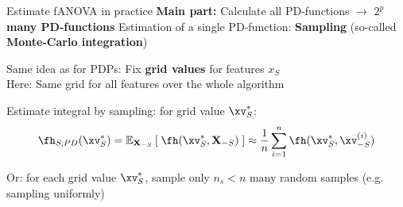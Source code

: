 \documentclass[10pt,compress,t,notes=noshow, xcolor=table]{beamer}
\newcommand{\Xv}{\mathbf{X}} %
\begin{document}
\begin{framev}[align=top]{Estimate fANOVA in practice
}
\textbf{Main part:} Calculate all PD-functions $\rightarrow$ \textbf{$2^p$ many PD-functions}
Estimation of a single PD-function: \textbf{Sampling}
(so-called \textbf{Monte-Carlo integration})
\begin{itemizeM}
\item Same idea as for PDPs: Fix \textbf{grid values} for features $x_S$ \\
Here: Same grid for all features over the whole algorithm
\item Estimate integral by sampling: for grid value $\xv_S^*$:
$$
\fh_{S, PD}(\xv_S^*)
= \mathbb{E}_{\Xv_{-S}} \left[ \; \fh(\xv_S^*, \Xv_{-S}) \; \right]
\approx \frac{1}{n} \sum_{i=1}^n \fh(\xv_S^*, \xv_{-S}^{(i)})
$$
\item Or: for each grid value $\xv_S^*$, sample only $n_s < n$ many random samples (e.g. sampling uniformly)
\end{itemizeM}
\end{framev}
\end{document}
